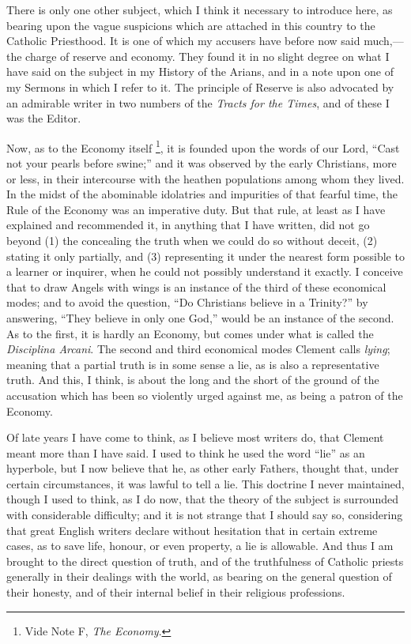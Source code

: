 There is only one other subject, which I think it necessary to
introduce here, as bearing upon the vague suspicions which are attached
in this country to the Catholic Priesthood. It is one of which my
accusers have before now said much,—the charge of reserve and
economy. They found it in no slight degree on what I have said
on the subject in my History of the Arians, and in a note upon one of my
Sermons in which I refer to it. The principle of Reserve is also
advocated by an admirable writer in two numbers of the \emph{Tracts for the
Times}, and of these I was the Editor.

Now, as to the Economy itself \footnote{Vide Note F, \emph{The
Economy}.}, it is founded upon the words of our Lord, ``Cast not your
pearls before swine;'' and it was observed by the early Christians,
more or less, in their intercourse with the heathen populations among
whom they lived. In the midst of the abominable idolatries and
impurities of that fearful time, the Rule of the Economy was an
imperative duty.
But that rule, at least as I have explained
and recommended it, in anything that I have written, did not go
beyond (1) the concealing the truth when we could do so without deceit,
(2) stating it only partially, and (3) representing it under the nearest
form possible to a learner or inquirer, when he could not possibly
understand it exactly. I conceive that to draw Angels with
wings is an instance of the third of these economical modes; and to
avoid the question, ``Do Christians believe in a Trinity?'' by
answering, ``They believe in only one God,'' would be an instance of
the second. As to the first, it is hardly an Economy, but comes under
what is called the \emph{Disciplina Arcani}. The second and third
economical modes Clement calls \emph{lying}; meaning that a partial
truth is in some sense a lie, as is also a representative
truth. And this, I think, is about the long and the short of the ground
of the accusation which has been so violently urged against me, as being
a patron of the Economy.

Of late years I have come to think, as I believe most writers do,
that Clement meant more than I have said. I used to think he used the
word ``lie'' as an hyperbole, but I now believe that he, as
other early Fathers, thought that, under certain circumstances, it
was lawful to tell a lie. This doctrine I never maintained, though I
used to think, as I do now, that the theory of the subject is surrounded
with considerable difficulty; and it is not strange that I should say
so, considering that great English writers declare without
hesitation that in certain extreme cases, as to save life, honour,
or even property, a lie is allowable. And thus I am brought to the
direct question of truth, and of the truthfulness of Catholic
priests generally in their dealings with the world, as bearing on the
general question of their honesty, and of their internal belief
in their religious professions.

